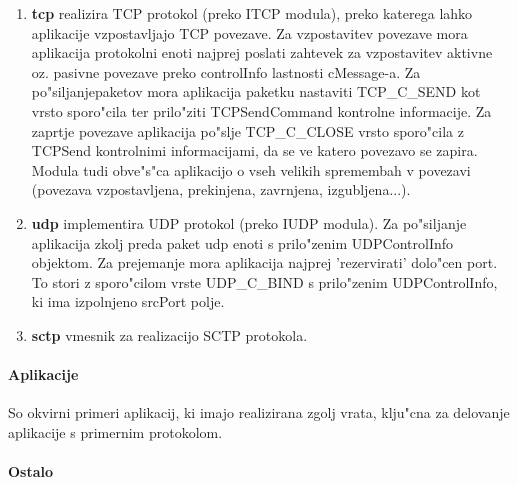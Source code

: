\documentclass[a4paper,11pt]{article}
\begin{document}
\begin{enumerate}

    \item \textbf{tcp} realizira TCP protokol (preko ITCP modula), preko katerega lahko aplikacije vzpostavljajo TCP povezave. Za vzpostavitev povezave mora aplikacija protokolni enoti najprej poslati zahtevek za vzpostavitev aktivne oz. pasivne povezave preko controlInfo lastnosti cMessage-a. Za po"siljanjepaketov mora aplikacija paketku nastaviti TCP\_C\_SEND kot vrsto sporo"cila ter prilo"ziti TCPSendCommand kontrolne informacije. Za zaprtje povezave aplikacija po"slje TCP\_C\_CLOSE vrsto sporo"cila z TCPSend kontrolnimi informacijami, da se ve katero povezavo se zapira. Modula tudi obve"s"ca aplikacijo o vseh velikih spremembah v povezavi (povezava vzpostavljena, prekinjena, zavrnjena, izgubljena...).

    \item \textbf{udp} implementira UDP protokol (preko IUDP modula). Za po"siljanje aplikacija zkolj preda paket udp enoti s prilo"zenim UDPControlInfo objektom. Za prejemanje mora aplikacija najprej 'rezervirati' dolo"cen port. To stori z sporo"cilom vrste UDP\_C\_BIND s prilo"zenim UDPControlInfo, ki ima izpolnjeno srcPort polje. 

    \item \textbf{sctp} vmesnik za realizacijo SCTP protokola.

\end{enumerate}






\paragraph{Aplikacije}
\label{description:aplikacije}

So okvirni primeri aplikacij, ki imajo realizirana zgolj vrata, klju"cna za delovanje aplikacije s primernim protokolom. 



\paragraph{Ostalo}
\label{description:ostalo}
\end{document}
